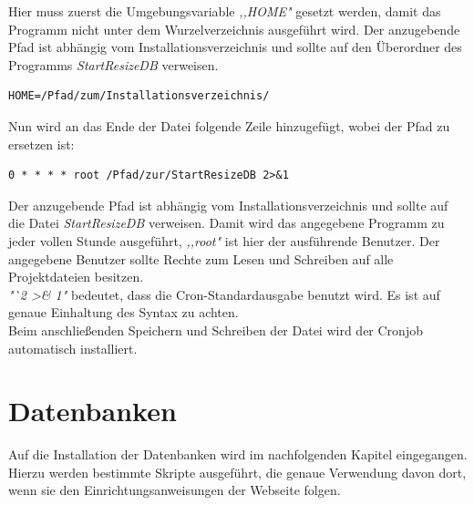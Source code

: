\documentclass[fontsize = 12pt, paper = a4]{scrreprt}
\begin{document}
Hier muss zuerst die Umgebungsvariable \textit{,,HOME"} gesetzt werden, damit das Programm nicht unter dem Wurzelverzeichnis ausgeführt wird. Der anzugebende Pfad ist abhängig vom Installationsverzeichnis und sollte auf den Überordner des Programms \textit{StartResizeDB} verweisen.
 
\vspace*{4mm}
\begin{lstlisting}[frame=single]
HOME=/Pfad/zum/Installationsverzeichnis/ 
\end{lstlisting} 
\vspace*{-2mm}


Nun wird an das Ende der Datei folgende Zeile hinzugefügt, wobei der Pfad zu ersetzen ist:

\vspace*{4mm}
\begin{lstlisting}[frame=single]
0 * * * * root /Pfad/zur/StartResizeDB 2>&1 
\end{lstlisting} 
\vspace*{-2mm}


Der anzugebende Pfad ist abhängig vom Installationsverzeichnis und sollte auf die Datei \textit{StartResizeDB} verweisen.
Damit wird das angegebene Programm zu jeder vollen Stunde ausgeführt, \textit{,,root"} ist hier der ausführende Benutzer. Der angegebene Benutzer sollte Rechte zum Lesen und Schreiben auf alle Projektdateien besitzen.\\
\textit{"`2 \textgreater \& 1"} bedeutet, dass die Cron-Standardausgabe benutzt wird.
Es ist auf genaue Einhaltung des Syntax zu achten.\\
Beim anschließenden Speichern und Schreiben der Datei wird der Cronjob automatisch installiert.









\section{Datenbanken}

Auf die Installation der Datenbanken wird im nachfolgenden Kapitel eingegangen. Hierzu werden bestimmte Skripte ausgeführt, die genaue Verwendung davon dort, wenn sie den Einrichtungsanweisungen der Webseite folgen.

\end{document}

